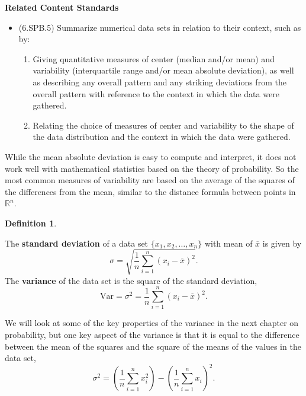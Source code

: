 \documentclass[
]{book}
\providecommand{\tightlist}{%
  \setlength{\itemsep}{0pt}\setlength{\parskip}{0pt}}
\newenvironment{standards}{}{}
\theoremstyle{definition}
\newtheorem{definition}{Definition}[chapter]
\theoremstyle{definition}
\theoremstyle{definition}
\theoremstyle{definition}
\theoremstyle{remark}
\begin{document}
\begin{standards}

\begin{center}
\textbf{Related Content Standards}

\end{center}

\begin{itemize}
\tightlist
\item
  (6.SPB.5) Summarize numerical data sets in relation to their context, such as by:

  \begin{enumerate}
  \def\labelenumi{\alph{enumi}.}
  \setcounter{enumi}{2}
  \tightlist
  \item
    Giving quantitative measures of center (median and/or mean) and variability (interquartile range and/or mean absolute deviation), as well as describing any overall pattern and any striking deviations from the overall pattern with reference to the context in which the data were gathered.
  \item
    Relating the choice of measures of center and variability to the shape of the data distribution and the context in which the data were gathered.
  \end{enumerate}
\end{itemize}

\end{standards}

While the mean absolute deviation is easy to compute and interpret, it does not work well with mathematical statistics based on the theory of probability. So the most common measures of variability are based on the average of the squares of the differences from the mean, similar to the distance formula between points in \(\mathbb{R}^n\).

\begin{definition}
\protect\hypertarget{def:unlabeled-div-301}{}\label{def:unlabeled-div-301}

The \textbf{standard deviation} of a data set \(\{x_1, x_2, \ldots, x_n\}\) with mean of \(\overline{x}\) is given by \[\sigma =  \sqrt{ \frac{1}{n} \sum_{i=1}^n \left(x_i - \overline{x}\right)^2}.\]
The \textbf{variance} of the data set is the square of the standard deviation,
\[\mathrm{Var} = \sigma^2 = \frac{1}{n} \sum_{i=1}^n \left(x_i - \overline{x}\right)^2.\]

\end{definition}

We will look at some of the key properties of the variance in the next chapter on probability, but one key aspect of the variance is that it is equal to the difference between the mean of the squares and the square of the means of the values in the data set,
\[\sigma^2 = \left(\frac{1}{n} \sum_{i=1}^n x_i^2\right) - \left( \frac{1}{n} \sum_{i=1}^n x_i \right)^2.\]
\end{document}
